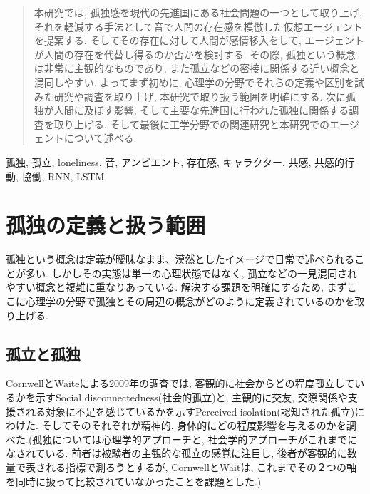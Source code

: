 \documentclass[a4paper,dvipdfmx]{hisken}
\begin{document}

\begin{abstract}
本研究では, 孤独感を現代の先進国にある社会問題の一つとして取り上げ, それを軽減する手法として音で人間の存在感を模倣した仮想エージェントを提案する. そしてその存在に対して人間が感情移入をして, エージェントが人間の存在を代替し得るのか否かを検討する. その際, 孤独という概念は非常に主観的なものであり, また孤立などの密接に関係する近い概念と混同しやすい. よってまず初めに, 心理学の分野でそれらの定義や区別を試みた研究や調査を取り上げ, 本研究で取り扱う範囲を明確にする. 次に孤独が人間に及ぼす影響, そして主要な先進国に行われた孤独に関係する調査を取り上げる. そして最後に工学分野での関連研究と本研究でのエージェントについて述べる.
\end{abstract}

\begin{keyword}	
孤独, 孤立, loneliness, 音, アンビエント, 存在感, キャラクター, 共感, 共感的行動, 協働, RNN, LSTM
\end{keyword}

\maketitle
	
\section{孤独の定義と扱う範囲}
孤独という概念は定義が曖昧なまま、漠然としたイメージで日常で述べられることが多い. しかしその実態は単一の心理状態ではなく, 孤立などの一見混同されやすい概念と複雑に重なりあっている. 解決する課題を明確にするため, まずここに心理学の分野で孤独とその周辺の概念がどのように定義されているのかを取り上げる.
\subsection{孤立と孤独}

CornwellとWaiteによる2009年の調査では, 客観的に社会からどの程度孤立しているかを示すSocial disconnectedness(社会的孤立)と, 主観的に交友, 交際関係や支援される対象に不足を感じているかを示すPerceived isolation(認知された孤立)にわけた{}\cite{tex1}. そしてそのそれぞれが精神的, 身体的にどの程度影響を与えるのかを調べた.(孤独については心理学的アプローチと, 社会学的アプローチがこれまでになされている. 前者は被験者の主観的な孤立の感覚に注目し, 後者が客観的に数量で表される指標で測ろうとするが, CornwellとWaitは, これまでその２つの軸を同時に扱って比較されていなかったことを課題とした.)
\end{document}
